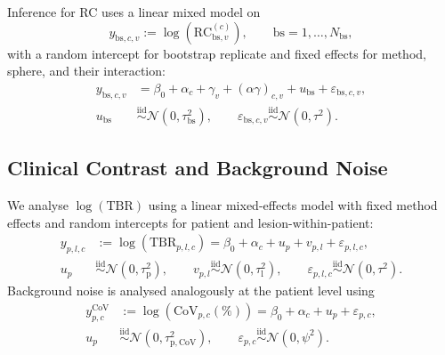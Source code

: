 Inference for RC uses a linear mixed model on
\begin{equation}
y_{\mathrm{bs},c,v} := \log\!\left(\mathrm{RC}^{(c)}_{\mathrm{bs},v}\right),
\qquad \mathrm{bs}=1,\ldots,N_{\mathrm{bs}},
\end{equation}
with a random intercept for bootstrap replicate and fixed effects for method, sphere, and their interaction:
\begin{align}
y_{\mathrm{bs},c,v} &= \beta_0 + \alpha_c + \gamma_v + (\alpha\gamma)_{c,v} + u_{\mathrm{bs}} + \varepsilon_{\mathrm{bs},c,v}, \nonumber \\
u_{\mathrm{bs}} &\overset{\mathrm{iid}}{\sim} \mathcal{N}(0,\tau_{\mathrm{bs}}^2),
\qquad
\varepsilon_{\mathrm{bs},c,v} \overset{\mathrm{iid}}{\sim} \mathcal{N}(0,\tau^2).
\end{align}

\subsection{Clinical Contrast and Background Noise}

We analyse $\log(\mathrm{TBR})$ using a linear mixed-effects model with fixed method effects and random intercepts for patient and lesion-within-patient:
\begin{equation}
\begin{aligned}
y_{p,l,c} &:= \log\!\left(\mathrm{TBR}_{p,l,c}\right)
= \beta_0 + \alpha_c + u_p + v_{p,l} + \varepsilon_{p,l,c},\\
u_p &\overset{\mathrm{iid}}{\sim} \mathcal{N}(0,\tau^2_{\mathrm{p}}),
\qquad
v_{p,l} \overset{\mathrm{iid}}{\sim} \mathcal{N}(0,\tau^2_{\mathrm{l}}),
\qquad
\varepsilon_{p,l,c} \overset{\mathrm{iid}}{\sim} \mathcal{N}(0,\tau^2).
\end{aligned}
\end{equation}
Background noise is analysed analogously at the patient level using
\begin{equation}
\begin{aligned}
y^{\mathrm{CoV}}_{p,c} &:= \log\!\left(\mathrm{CoV}_{p,c}(\%)\right)
= \beta_0 + \alpha_c + u_p + \varepsilon_{p,c},\\
u_p &\overset{\mathrm{iid}}{\sim} \mathcal{N}(0,\tau^2_{\mathrm{p,CoV}}),
\qquad
\varepsilon_{p,c} \overset{\mathrm{iid}}{\sim} \mathcal{N}(0,\psi^2).
\end{aligned}
\end{equation}
